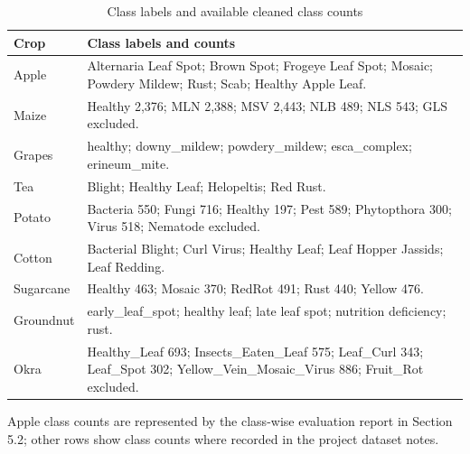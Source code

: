 \documentclass[12pt,a4paper,oneside]{report}
\begin{document}
\begin{table}[H]\centering\small\caption{Class labels and available cleaned class counts}\label{tab:classes}\begin{tabularx}{\textwidth}{lY}\toprule Crop & Class labels and counts\\\midrule
Apple&Alternaria Leaf Spot; Brown Spot; Frogeye Leaf Spot; Mosaic; Powdery Mildew; Rust; Scab; Healthy Apple Leaf.\\
Maize&Healthy 2,376; MLN 2,388; MSV 2,443; NLB 489; NLS 543; GLS excluded.\\
Grapes&healthy; downy\_mildew; powdery\_mildew; esca\_complex; erineum\_mite.\\
Tea&Blight; Healthy Leaf; Helopeltis; Red Rust.\\
Potato&Bacteria 550; Fungi 716; Healthy 197; Pest 589; Phytopthora 300; Virus 518; Nematode excluded.\\
Cotton&Bacterial Blight; Curl Virus; Healthy Leaf; Leaf Hopper Jassids; Leaf Redding.\\
Sugarcane&Healthy 463; Mosaic 370; RedRot 491; Rust 440; Yellow 476.\\
Groundnut&early\_leaf\_spot; healthy leaf; late leaf spot; nutrition deficiency; rust.\\
Okra&Healthy\_Leaf 693; Insects\_Eaten\_Leaf 575; Leaf\_Curl 343; Leaf\_Spot 302; Yellow\_Vein\_Mosaic\_Virus 886; Fruit\_Rot excluded.\\\bottomrule\end{tabularx}\end{table}
Apple class counts are represented by the class-wise evaluation report in Section 5.2; other rows show class counts where recorded in the project dataset notes.
\end{document}
